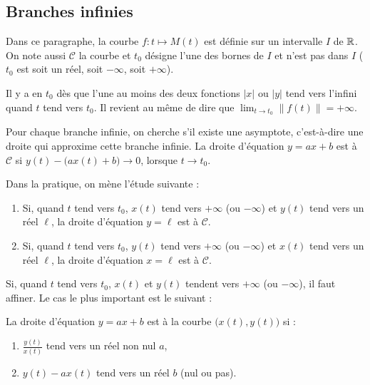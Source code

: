 \documentclass[class=report,crop=false]{standalone}
\begin{document}
\subsection{Branches infinies}

Dans ce paragraphe, la courbe $f : t\mapsto M(t)$ est définie sur un intervalle
$I$ de $\mathbb{R}$. On note aussi $\mathcal{C}$ la courbe
et $t_0$ désigne l'une des bornes de $I$ et n'est pas dans $I$
($t_0$ est soit un réel, soit $-\infty$, soit $+\infty$).


\begin{definition}
Il y a  en $t_0$ dès que l'une au moins des deux
fonctions $|x|$ ou $|y|$ tend vers l'infini quand $t$ tend vers $t_0$.
Il revient au même de dire que $\lim_{t \to t_0}\|f(t)\|=+\infty$.
\end{definition}

Pour chaque branche infinie, on cherche s'il existe une asymptote,
c'est-à-dire une droite qui approxime cette branche infinie.
La droite d'équation $y = ax+b$ est  à $\mathcal{C}$
si $y(t) - \big( a x(t) + b \big) \to 0$, lorsque $t \to t_0$.


Dans la pratique, on mène l'étude suivante :
\begin{enumerate}
\item Si, quand $t$ tend vers $t_0$, $x(t)$ tend vers $+\infty$ (ou
$-\infty$) et $y(t)$ tend vers un réel $\ell$, la droite d'équation
$y=\ell$ est  à $\mathcal{C}$.

\item Si, quand $t$ tend vers $t_0$, $y(t)$ tend vers $+\infty$ (ou
$-\infty$) et $x(t)$ tend vers un réel $\ell$, la droite d'équation
$x=\ell$ est  à $\mathcal{C}$.
\end{enumerate}



Si, quand $t$ tend vers $t_0$, $x(t)$ et $y(t)$ tendent vers
$+\infty$ (ou $-\infty$), il faut affiner. Le cas le plus important est le suivant :
\begin{definition}
La droite d'équation
$y=ax+b$ est  à la courbe $\big(x(t),y(t) \big)$ si :
\begin{enumerate}
  \item $\frac{y(t)}{x(t)}$ tend vers un réel non nul $a$,
  \item $y(t)-ax(t)$ tend vers un réel $b$ (nul ou pas).
\end{enumerate}
\end{definition}
\end{document}
